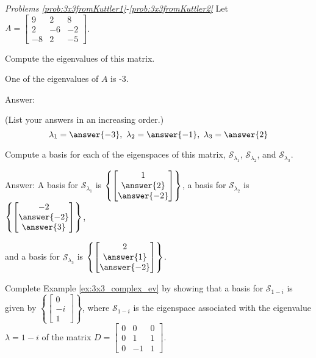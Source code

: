 \documentclass{ximera}
\begin{document}
\emph{Problems \ref{prob:3x3fromKuttler1}-\ref{prob:3x3fromKuttler2}}
Let $A=\begin{bmatrix} 9 & 2 & 8\\ 2 & -6 & -2\\ -8 & 2 & -5\end{bmatrix}$. 
    
\begin{problem}\label{prob:3x3fromKuttler1}
Compute the eigenvalues of this matrix.
\begin{hint}
One of the eigenvalues of $A$ is -3.
\end{hint}
    
Answer:
    
(List your answers in an increasing order.)
$$\lambda_1 = \answer{-3},\quad \lambda_2 = \answer{-1},\quad \lambda_3 = \answer{2}$$
\end{problem}
    
\begin{problem}\label{prob:3x3fromKuttler2}
Compute a basis for each of the eigenspaces of this matrix,  $\mathcal{S}_{\lambda_1}$, $\mathcal{S}_{\lambda_2}$, and $\mathcal{S}_{\lambda_3}$.
    
Answer:
A basis for $\mathcal{S}_{\lambda_1}$ is $\left\{\begin{bmatrix}1\\\answer{2}\\\answer{-2}\end{bmatrix}\right\}$,
a basis for $\mathcal{S}_{\lambda_2}$ is $\left\{\begin{bmatrix}-2\\\answer{-2}\\\answer{3}\end{bmatrix}\right\}$,
    
and a basis for $\mathcal{S}_{\lambda_3}$ is $\left\{\begin{bmatrix}2\\\answer{1}\\\answer{-2}\end{bmatrix}\right\}$.
\end{problem}
    
    
\begin{problem}\label{prob:3x3_complex_ev}
Complete Example \ref{ex:3x3_complex_ev} by showing that a basis for $\mathcal{S}_{1-i}$ is given by $\left\{\begin{bmatrix}0\\-i\\1\end{bmatrix}\right\}$, where  $\mathcal{S}_{1-i}$ is the eigenspace associated with the eigenvalue $\lambda=1-i$ of the matrix $D=\begin{bmatrix} 0&0&0\\ 0 &1&1\\ 0 & -1&1\end{bmatrix}$.
\end{problem}
    
\end{document}
